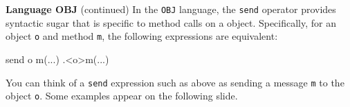 \begin{minipage}[t]{\sw}
\slidenumber
\LARGE
{\bf Language OBJ} (continued)\exx
In the \verb'OBJ' language,
the \verb'send' operator provides syntactic sugar
that is specific to method calls on a object.
Specifically, for an object \verb'o' and method \verb'm',
the following expressions are equivalent:
\begin{qv}
send o m(...)
.<o>m(...)
\end{qv}
You can think of a \verb'send' expression such as above
as sending a message \verb'm' to the object \verb'o'.
Some examples appear on the following slide.
\end{minipage}
